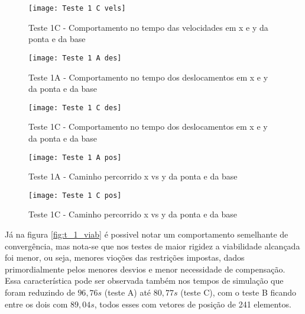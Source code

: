 \begin{figure}[!htb]
    \begin{center}
    \caption{Teste 1C - Comportamento no tempo das velocidades em x e y da ponta e da base}
    \texttt{[image: Teste 1 C vels]}
    \label{fig:t_1c_vels}
    \end{center}
\end{figure}

\begin{figure}[!htb]
    \begin{center}
    \caption{Teste 1A - Comportamento no tempo dos deslocamentos em x e y da ponta e da base}
    \texttt{[image: Teste 1 A des]}
    \label{fig:t_1a_des}
    \end{center}
\end{figure}

\begin{figure}[!htb]
    \begin{center}
    \caption{Teste 1C - Comportamento no tempo dos deslocamentos em x e y da ponta e da base}
    \texttt{[image: Teste 1 C des]}
    \label{fig:t_1c_des}
    \end{center}
\end{figure}

\begin{figure}[!htb]
    \begin{center}
    \caption{Teste 1A - Caminho percorrido x vs y da ponta e da base}
    \texttt{[image: Teste 1 A pos]}
    \label{fig:t_1a_pos}
    \end{center}
\end{figure}

\begin{figure}[!htb]
    \begin{center}
    \caption{Teste 1C - Caminho percorrido x vs y da ponta e da base}
    \texttt{[image: Teste 1 C pos]}
    \label{fig:t_1c_pos}
    \end{center}
\end{figure}

Já na figura \ref{fig:t_1_viab} é possivel notar um comportamento semelhante de convergência, mas nota-se que
nos testes de maior rigidez a viabilidade alcançada foi menor, ou seja, menores vioções das restrições impostas, dados
primordialmente pelos menores desvios e menor necessidade de compensação.
Essa característica pode ser observada também nos tempos de simulação que foram reduzindo de $96,76 s$ (teste A) até
$80,77 s$ (teste C), com o teste B ficando entre os dois com $89,04 s$, todos esses com vetores de posição de 241 elementos.

